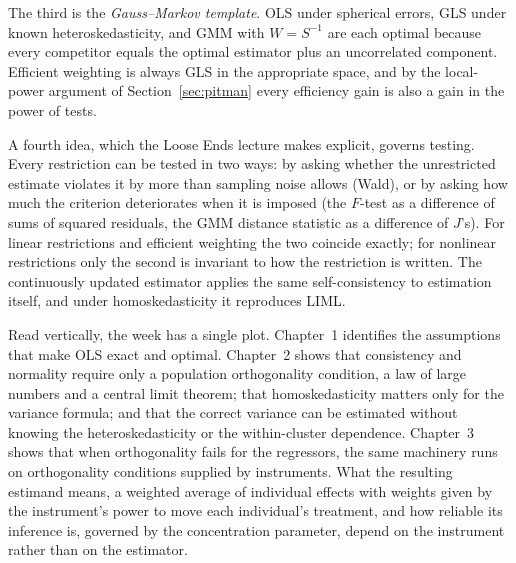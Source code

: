 \documentclass[11pt,a4paper]{article}
\begin{document}
The third is the \emph{Gauss--Markov template}. OLS under spherical errors, GLS under known heteroskedasticity, and GMM with $W=S^{-1}$ are each optimal because every competitor equals the optimal estimator plus an uncorrelated component. Efficient weighting is always GLS in the appropriate space, and by the local-power argument of Section~\ref{sec:pitman} every efficiency gain is also a gain in the power of tests.

A fourth idea, which the Loose Ends lecture makes explicit, governs testing. Every restriction can be tested in two ways: by asking whether the unrestricted estimate violates it by more than sampling noise allows (Wald), or by asking how much the criterion deteriorates when it is imposed (the $F$-test as a difference of sums of squared residuals, the GMM distance statistic as a difference of $J$'s). For linear restrictions and efficient weighting the two coincide exactly; for nonlinear restrictions only the second is invariant to how the restriction is written. The continuously updated estimator applies the same self-consistency to estimation itself, and under homoskedasticity it reproduces LIML.

Read vertically, the week has a single plot. Chapter~1 identifies the assumptions that make OLS exact and optimal. Chapter~2 shows that consistency and normality require only a population orthogonality condition, a law of large numbers and a central limit theorem; that homoskedasticity matters only for the variance formula; and that the correct variance can be estimated without knowing the heteroskedasticity or the within-cluster dependence. Chapter~3 shows that when orthogonality fails for the regressors, the same machinery runs on orthogonality conditions supplied by instruments. What the resulting estimand means, a weighted average of individual effects with weights given by the instrument's power to move each individual's treatment, and how reliable its inference is, governed by the concentration parameter, depend on the instrument rather than on the estimator.

\end{document}
